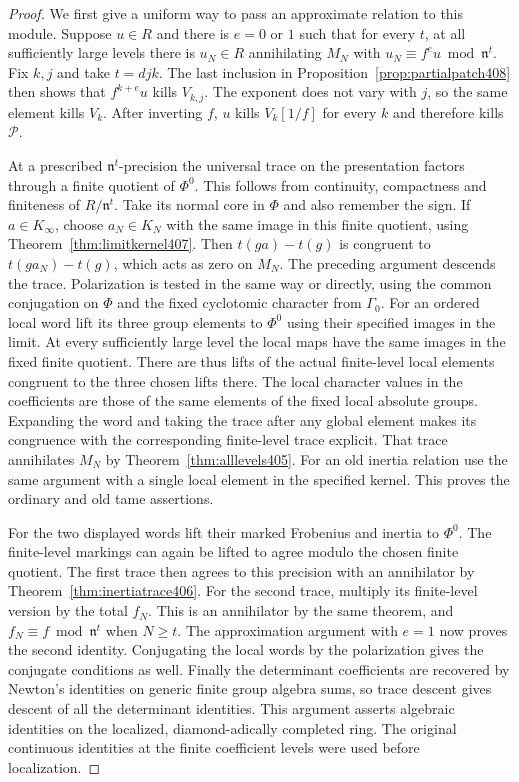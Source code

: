\documentclass[a4paper,11pt]{article}
\theoremstyle{definition}
\theoremstyle{remark}
\numberwithin{equation}{section}
\begin{document}
\begin{proof}
We first give a uniform way to pass an approximate relation
to this module. Suppose \(u\in R\) and there is \(e=0\) or
\(1\) such that for every \(t\), at all sufficiently large
levels there is \(u_N\in R\) annihilating \(M_N\) with
\(u_N\equiv f^e u\bmod\mathfrak n^t\). Fix \(k,j\) and take
\(t=djk\). The last inclusion in
Proposition~\ref{prop:partialpatch408} then shows that
\(f^{k+e}u\) kills \(V_{k,j}\). The exponent does not vary
with \(j\), so the same element kills \(V_k\). After inverting
\(f\), \(u\) kills \(V_k[1/f]\) for every \(k\) and therefore
kills \(\mathcal P\).

At a prescribed \(\mathfrak n^t\)-precision the universal
trace on the presentation factors through a finite quotient
of \(\Phi^0\). This follows from continuity, compactness
and finiteness of \(R/\mathfrak n^t\). Take its normal core
in \(\Phi\) and also remember the sign. If \(a\in K_\infty\),
choose \(a_N\in K_N\) with the same image in this finite
quotient, using Theorem~\ref{thm:limitkernel407}.
Then \(t(ga)-t(g)\) is congruent to \(t(ga_N)-t(g)\),
which acts as zero on \(M_N\). The preceding argument
descends the trace. Polarization is tested in the same way
or directly, using the common conjugation on \(\Phi\) and
the fixed cyclotomic character from \(\Gamma_0\).
For an ordered local word lift its three group elements to
\(\Phi^0\) using their specified images in the limit. At
every sufficiently large level the local maps have the same
images in the fixed finite quotient. There are thus lifts
of the actual finite-level local elements congruent to the
three chosen lifts there. The local character values in
the coefficients are those of the same elements of the
fixed local absolute groups. Expanding the word and taking
the trace after any global element makes its congruence with
the corresponding finite-level trace explicit. That trace
annihilates \(M_N\) by Theorem~\ref{thm:alllevels405}.
For an old inertia relation use the same argument with a
single local element in the specified kernel. This proves
the ordinary and old tame assertions.

For the two displayed words lift their marked Frobenius
and inertia to \(\Phi^0\). The finite-level markings can
again be lifted to agree modulo the chosen finite quotient.
The first trace then agrees to this precision with an
annihilator by Theorem~\ref{thm:inertiatrace406}. For the
second trace, multiply its finite-level version by the total
\(f_N\). This is an annihilator by the same theorem, and
\(f_N\equiv f\bmod\mathfrak n^t\) when \(N\ge t\). The
approximation argument with \(e=1\) now proves the second
identity. Conjugating the local words by the polarization
gives the conjugate conditions as well. Finally the
determinant coefficients are recovered by Newton's identities
on generic finite group algebra sums, so trace descent
gives descent of all the determinant identities. This
argument asserts algebraic identities on the localized,
diamond-adically completed ring. The original continuous
identities at the finite coefficient levels were used
before localization.
\end{proof}
\end{document}
